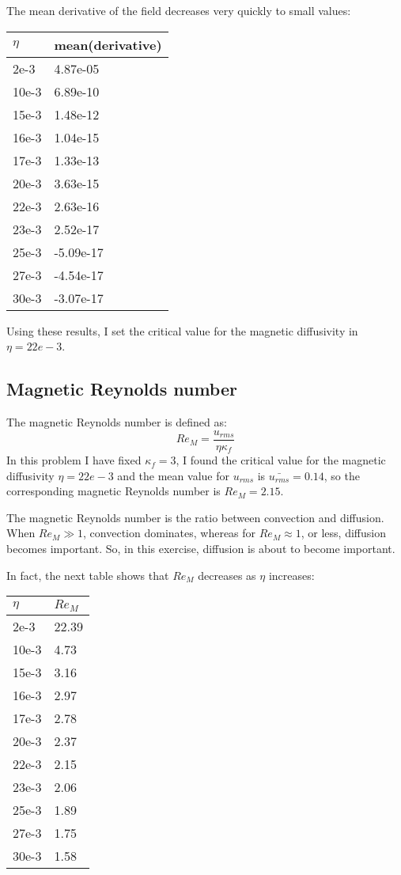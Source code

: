 The mean derivative of the field decreases very quickly to small values:
\begin{center}
\begin{tabular}{ll}
$\eta$ & mean(derivative)\\\hline
2e-3 & 4.87e-05\\
10e-3 & 6.89e-10\\
15e-3 & 1.48e-12\\
16e-3 & 1.04e-15\\
17e-3 & 1.33e-13\\
20e-3 & 3.63e-15\\
22e-3 & 2.63e-16\\
23e-3 & 2.52e-17\\
25e-3 & -5.09e-17\\
27e-3 & -4.54e-17\\
30e-3 & -3.07e-17\\
\end{tabular}
\end{center}

Using these results, I set the critical value for the magnetic diffusivity in $\eta = 22e-3$.

\subsection{Magnetic Reynolds number}
The magnetic Reynolds number is defined as:
\begin{equation}
 Re_M = \frac{u_{rms}}{\eta \kappa_f}
\end{equation}
In this problem I have fixed $\kappa_f = 3$, I found the critical value for the magnetic diffusivity  $\eta = 22e-3$ and the mean value for $u_{rms}$ is $\bar{u_{rms}} = 0.14$, so the corresponding magnetic Reynolds number is $Re_M = 2.15$.

The magnetic Reynolds number is the ratio between convection and diffusion. When $Re_M \gg 1$, convection dominates, whereas for $Re_M \approx 1$, or less, diffusion becomes important. So, in this exercise, diffusion is about to become important.

In fact, the next table shows that $Re_M$ decreases as $\eta$ increases:
\begin{center}
\begin{tabular}{ll}
$\eta$ & $Re_M$\\\hline
2e-3 & 22.39\\
10e-3 & 4.73\\
15e-3 & 3.16\\
16e-3 & 2.97\\
17e-3 & 2.78\\
20e-3 & 2.37\\
22e-3 & 2.15\\
23e-3 & 2.06\\
25e-3 & 1.89\\
27e-3 & 1.75\\
30e-3 & 1.58\\
\end{tabular}
\end{center}


